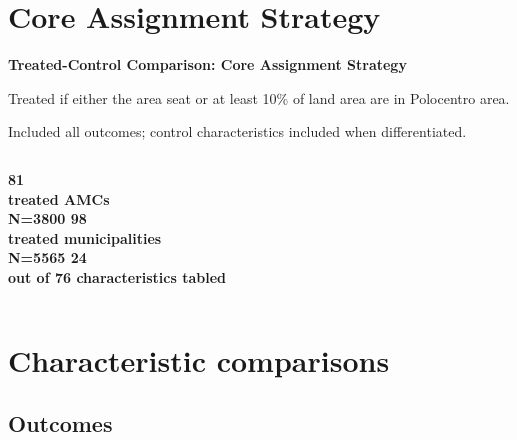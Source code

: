 \documentclass[aspectratio=169]{beamer}
\begin{document}
\section{Core Assignment Strategy}
\begin{frame}[plain]
\vfill
{\Huge\bfseries Treated-Control Comparison: Core Assignment Strategy \par}
\vspace{1em}
{\large Treated if either the area seat or at least 10\% of land area are in Polocentro area.\par}
{\large Included all outcomes; control characteristics included when differentiated.\par}
\vspace{2em}
\begin{columns}[T,totalwidth=\textwidth]
\centering\Huge\bfseries 81\\\normalsize treated AMCs \\N=3800
\centering\Huge\bfseries 98\\\normalsize treated municipalities\\ N=5565
\centering\Huge\bfseries 24\\\normalsize out of 76 characteristics tabled
\end{columns}
\vfill
\end{frame}

\section{Characteristic comparisons}
\subsection{Outcomes}

\end{document}
